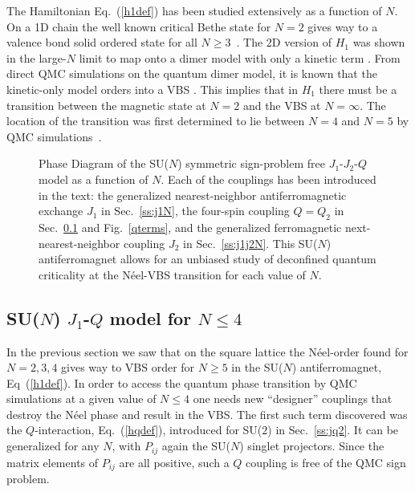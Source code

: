 \documentclass[range]{ar2e}
\begin{document}
The Hamiltonian Eq.~(\ref{h1def})
has been studied extensively as a function of $N$. On a 1D chain the well known critical Bethe state for $N=2$ gives way to a 
valence bond solid ordered state for all $N\geq 3$~\cite{barber1989:d1n3_vbs,klumper1989:d1n3_vbs,affleck1985:lgN}. The 2D version of $H_{1}$ was shown 
in the large-$N$ limit to map onto a dimer model with only a kinetic term \cite{read1989:nucphysB}. From direct QMC simulations on the quantum dimer model, 
it is known that the kinetic-only model orders into a VBS \cite{sachdev1989:qd_vbs}.  This implies that in $H_{1}$ there must be a transition between the 
magnetic state at $N=2$ and the VBS at $N=\infty$.  The location of the transition was first determined to lie between $N=4$ and $N=5$ 
by QMC simulations~\cite{harada2003:sun}.


\begin{figure}
\centerline{}
  \caption{ \label{fig:pdj1j2q} Phase Diagram of the SU($N$) symmetric sign-problem free
    $J_1$-$J_2$-$Q$ model as a function of $N$. Each of the couplings has been introduced
    in the text: the generalized nearest-neighbor antiferromagnetic exchange $J_1$ in Sec.~\ref{ss:j1N}, the four-spin coupling $Q=Q_2$ in 
    Sec.~\ref{ss:jqN} and Fig.~\ref{qterms}, and the generalized ferromagnetic next-nearest-neighbor coupling $J_2$ in Sec.~\ref{ss:j1j2N}. 
    This SU($N$) antiferromagnet allows for an unbiased study of deconfined quantum
    criticality at the N\'eel-VBS transition for each value of $N$. }
\end{figure}


\subsection{SU($N$) $J_1$-$Q$ model for $N\leq 4$}
\label{ss:jqN}
In the previous section we saw that on the square lattice the N\'eel-order found for $N=2,3,4$ gives way to VBS
order for $N\geq 5$ in the SU($N$) antiferromagnet, Eq~(\ref{h1def}). In order to access the quantum phase transition by QMC simulations at a 
given value of $N\leq 4$ one needs new ``designer'' couplings that destroy the N\'eel phase and result in the VBS. The first such term discovered 
was the $Q$-interaction, Eq.~(\ref{hqdef}), introduced for SU($2$) in Sec.~\ref{ss:jq2}. It can be generalized for any $N$, with $P_{ij}$ again 
the SU($N$) singlet projectors. Since the matrix elements of $P_{ij}$ are all positive, such a $Q$ coupling is free of the QMC sign problem. 
\end{document}

